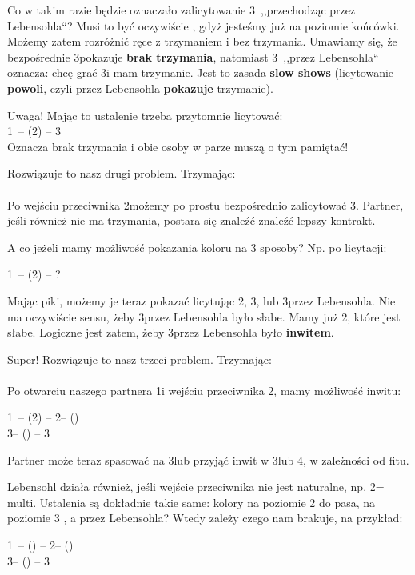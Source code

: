\documentclass[12pt, a4paper]{article}
\begin{document}
Co w takim razie będzie oznaczało zalicytowanie 3\nt\ ,,przechodząc przez Lebensohla``?
Musi to być oczywiście \gf, gdyż jesteśmy już na poziomie końcówki. Możemy zatem rozróżnić ręce
z trzymaniem i bez trzymania. Umawiamy się, że bezpośrednie 3\nt pokazuje \textbf{brak trzymania},
natomiast 3\nt\ ,,przez Lebensohla`` oznacza: chcę grać 3\nt i mam trzymanie. Jest to zasada 
\textbf{slow shows} (licytowanie \textbf{powoli}, czyli przez Lebensohla \textbf{pokazuje} trzymanie).

Uwaga! Mając to ustalenie trzeba przytomnie licytować:\\
1\nt\ -- (2\spades) -- 3\nt\\
Oznacza brak trzymania i obie osoby w parze muszą o tym pamiętać!

Rozwiązuje to nasz drugi problem. Trzymając:\\
\\
Po wejściu przeciwnika 2\spades możemy po prostu bezpośrednio zalicytować 3\nt. 
Partner, jeśli również nie ma trzymania, postara się znaleźć znaleźć lepszy kontrakt.

A co jeżeli mamy możliwość pokazania koloru na 3 sposoby? Np. po licytacji:

1\nt\ -- (2\hearts) -- ?

Mając piki, możemy je teraz pokazać licytując 2\spades, 3\spades, lub 3\spades przez Lebensohla.
Nie ma oczywiście sensu, żeby 3\spades przez Lebensohla było słabe. Mamy już 2\spades, które 
jest słabe. Logiczne jest zatem, żeby 3\spades przez Lebensohla było \textbf{inwitem}. 

Super! Rozwiązuje to nasz trzeci problem. Trzymając:\\
\\
Po otwarciu naszego partnera 1\nt i wejściu przeciwnika 2\hearts, mamy możliwość inwitu:

1\nt\ -- (2\hearts) -- 2\nt -- (\pass)\\
3\clubs -- (\pass) -- 3\spades

Partner może teraz spasować na 3\spades lub przyjąć inwit w 3\nt lub 4\spades, w zależności
od fitu.

Lebensohl działa również, jeśli wejście przeciwnika nie jest naturalne, np. 2\diams = multi.
Ustalenia są dokładnie takie same: kolory na poziomie 2 do pasa, na poziomie 3 \gf,
a przez Lebensohla? Wtedy zależy czego nam brakuje, na przykład:

1\nt\ -- (\alrts{2\diams}) -- 2\nt -- (\pass)\\
3\clubs -- (\pass) -- 3\diams
\end{document}
